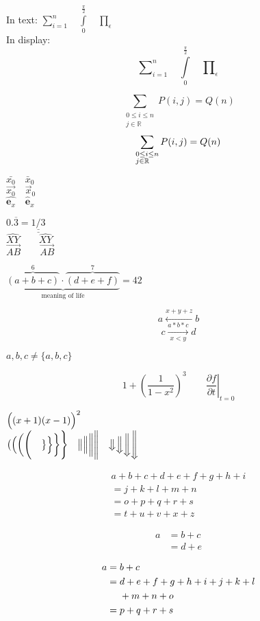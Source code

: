 \documentclass{article}
\theoremstyle{definition} \newtheorem{law}{Law}
\theoremstyle{plain} \newtheorem{jury}[law]{Jury}
\theoremstyle{remark} \newtheorem*{mar}{Margaret}
\begin{document}
In text:
$\sum\limits_{i=1}^n \quad
\int\limits_0^{\frac{\pi}{2}} \quad
\prod\limits_\epsilon $ \\
In display:
\[\sum\nolimits_{i=1}^n \quad
\int\limits_0^{\frac{\pi}{2}} \quad
\prod\nolimits_\epsilon \]

\[
\sum_{\substack{0\le i\le n \\
j\in \mathbb{R}}}
P(i,j) = Q(n)
\]
\[
\sum_{\begin{subarray}{l}
0\le i\le n \\
j\in \mathbb{R}
\end{subarray}}
P(i,j) = Q(n)
\]

$\bar{x_0} \quad \bar{x}_0$\\[5pt]
$\vec{x_0} \quad \vec{x}_0$\\[5pt]
$\hat{\mathbf{e}_x} \quad
\hat{\mathbf{e}}_x$

$0.\overline{3} =
\underline{\underline{1/3}}$ \\[5pt]
$\hat{XY} \qquad \widehat{XY}$\\[5pt]
$\vec{AB} \qquad
\overrightarrow{AB}$

$\underbrace{\overbrace{(a+b+c)}^6
\cdot \overbrace{(d+e+f)}^7}
_\text{meaning of life} = 42$

\[ a\xleftarrow{x+y+z} b \]
\[ c\xrightarrow[x<y]{a*b*c}d \]

${a,b,c} \neq \{a,b,c\}$

\[1 + \left(\frac{1}{1-x^{2}}
\right)^3 \qquad
\left.\frac{\partial f}{\partial t}
\right|_{t=0}\]

$\Bigl((x+1)(x-1)\Bigr)^{2}$\\
$\bigl( \Bigl( \biggl( \Biggl( \quad
\bigr\} \Bigr\} \biggr\} \Biggr\} \quad
\big\| \Big\| \bigg\| \Bigg\| \quad
\big\Downarrow \Big\Downarrow
\bigg\Downarrow \Bigg\Downarrow$

\begin{multline}
    a + b + c + d + e + f
    + g + h + i \\
    = j + k + l + m + n\\
    = o + p + q + r + s\\
    = t + u + v + x + z
\end{multline}

\begin{align}
    a & = b + c \\
    & = d + e
\end{align}

\begin{align}
    a ={} & b + c \\
    ={} & d + e + f + g + h + i
    + j + k + l \notag \\
    & + m + n + o \\
    ={} & p + q + r + s
\end{align}
\end{document}
